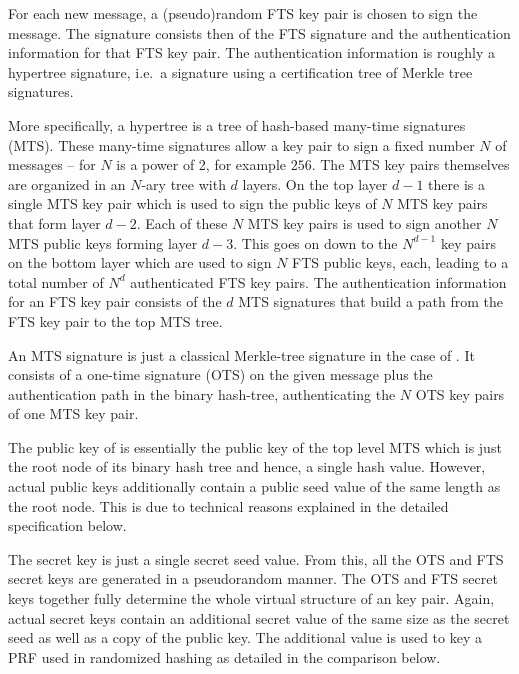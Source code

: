 For each new message, a (pseudo)random FTS key pair is chosen to sign the message.
The signature consists then of the FTS signature and the authentication 
information for that FTS key pair. The authentication information is roughly a 
hypertree signature, i.e.~a signature using a certification tree of Merkle tree 
signatures. 

More specifically, a hypertree is a tree of hash-based many-time signatures (MTS). 
These many-time signatures allow a key pair to sign a fixed number $N$ of 
messages -- for \spx $N$ is a power of 2, for example $256$. The MTS 
key pairs themselves are organized in an $N$-ary tree with $d$ layers. On the 
top layer $d-1$ there is a single MTS key pair which is used to sign the public keys of
$N$ MTS key pairs that form layer $d-2$. Each of these $N$ MTS key pairs is used
to sign another $N$ MTS public keys forming layer $d-3$. This goes on down to the 
$N^{d-1}$ key pairs on the bottom layer which are used to sign $N$ FTS public 
keys, each, leading to a total number of $N^d$ authenticated FTS key pairs. The
authentication information for an FTS key pair consists of the $d$ MTS 
signatures that build a path from the FTS key pair to the top MTS tree.

An MTS signature is just a classical Merkle-tree signature in the case of \spx.
It consists of a one-time signature (OTS) on the given message plus the authentication
path in the binary hash-tree, authenticating the $N$ OTS key pairs of one MTS key 
pair. 

The public key of \spx is essentially the public key of the top level MTS which
is just the root node of its binary hash tree and hence, a single hash value. 
However, actual \spx public keys additionally contain a public seed value of the 
same length as the root node. This is due to technical reasons explained in the 
detailed specification below.

The \spx secret key is just a single secret seed value. From this, all the OTS 
and FTS secret keys are generated in a pseudorandom manner. The OTS and FTS
secret keys together fully determine the whole virtual structure of an \spx 
key pair. Again, actual \spx secret keys contain an additional secret value of 
the same size as the secret seed as well as a copy of the public key. The 
additional value is used to key a PRF 
used in randomized hashing as detailed in the comparison below.

